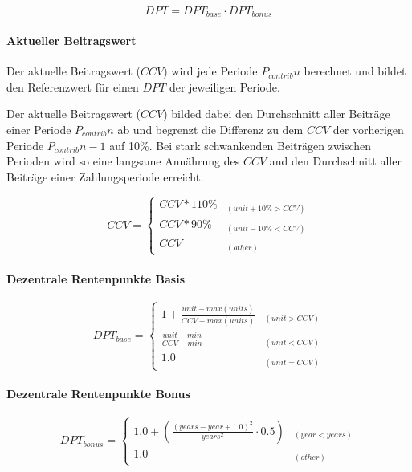 \begin{equation}
DPT = DPT_{base} \cdot DPT_{bonus}
\end{equation}

\paragraph*{Aktueller Beitragswert}

Der aktuelle Beitragswert ($CCV$) wird jede Periode $P_{contrib}{n}$ berechnet
und bildet den Referenzwert für einen $DPT$ der jeweiligen Periode.

Der aktuelle Beitragswert ($CCV$) bilded dabei den Durchschnitt aller Beiträge 
einer Periode $P_{contrib}{n}$ ab und begrenzt die Differenz zu dem $CCV$ der
vorherigen Periode $P_{contrib}{n-1}$ auf 10\%. Bei stark schwankenden Beiträgen
zwischen Perioden wird so eine langsame Annährung des $CCV$ and den Durchschnitt
aller Beiträge einer Zahlungsperiode erreicht.

\begin{equation}
CCV = \begin{cases} 
CCV * 110\% & _{(unit+10\% > CCV)} \\
CCV * 90\% & _{(unit-10\% < CCV)} \\
CCV & _{(other)}
\end{cases}
\end{equation}

\paragraph*{Dezentrale Rentenpunkte Basis}

\begin{equation}
DPT_{base} = \begin{cases} 
1 + \frac{unit-max(units)} {CCV - max(units)} 
  & _{(unit > CCV)} \\
\frac{unit - min} {CCV - min} 
  & _{(unit < CCV)} \\
1.0 & _{(unit = CCV)}
\end{cases}
\end{equation}

\paragraph*{Dezentrale Rentenpunkte Bonus}

\begin{equation}
DPT_{bonus} = \begin{cases} 
1.0 + (\frac{(years - year + 1.0)^2}
      {years^2} \cdot 0.5) & _{(year < years)} \\
1.0 & _{(other)} 
\end{cases}
\end{equation}



